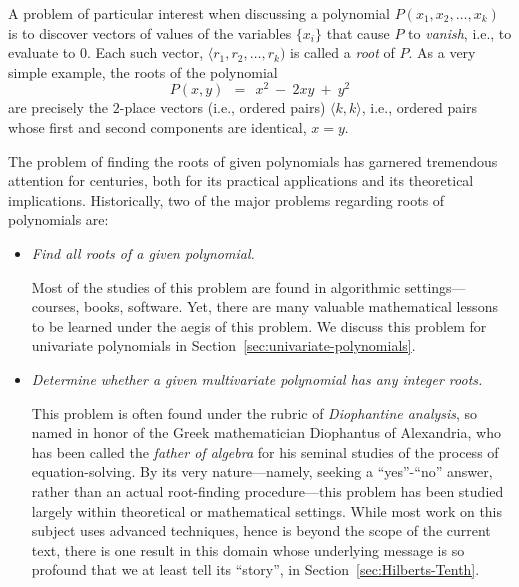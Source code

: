\bigskip


A problem of particular interest when discussing a polynomial $P(x_1, x_2, \ldots, x_k)$ is to discover vectors of values of the variables $\{x_i\}$ that cause $P$ to {\em vanish}, i.e., to evaluate to $0$.  Each such vector, $\langle r_1, r_2, \ldots, r_k)$ is called a {\it root} of $P$.  As a very simple example, the roots of the polynomial
\[ P(x,y) \ \ = \ \ x^2 \ - \ 2xy \ + \ y^2 \]
are precisely the $2$-place vectors (i.e., ordered pairs) $\langle k,k \rangle$, i.e., ordered pairs whose first and second components are identical, $x=y$.

\medskip

The problem of finding the roots of given polynomials has garnered tremendous attention for centuries, both for its practical applications and its theoretical implications.  Historically, two of the major problems regarding roots of polynomials are:
\begin{itemize}
\item
{\em Find all roots of a given polynomial.}

\smallskip

Most of the studies of this problem are found in algorithmic settings---courses, books, software.  Yet, there are many valuable mathematical lessons to be learned under the aegis of this problem.  We discuss this problem for univariate polynomials in Section~\ref{sec:univariate-polynomials}.

\item
{\em Determine whether a given multivariate polynomial has any integer roots.}

\smallskip

This problem is often found under the rubric of {\it Diophantine analysis}, so named in honor of the Greek mathematician Diophantus of Alexandria, who has been called the {\em father of algebra} for his seminal studies of the process of equation-solving.  By its very nature---namely, seeking a ``{\sc yes}''-``{\sc no}'' answer, rather than an actual root-finding procedure---this problem has been studied largely within theoretical or mathematical settings.  While most work on this subject uses advanced techniques, hence is beyond the scope of the current text, there is one result in this domain whose underlying message is so profound that we at least tell its ``story'', in Section~\ref{sec:Hilberts-Tenth}.
\end{itemize}
 

